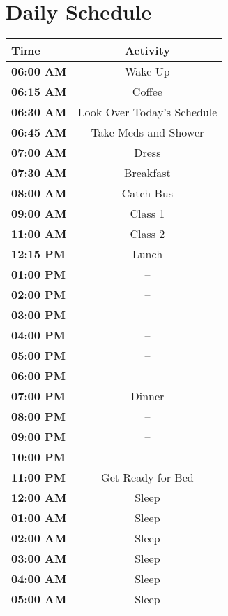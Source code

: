 \documentclass[10pt]{article}
\begin{document}
\section*{Daily Schedule}
\label{sec:dailyschedule}
\begin{center}
\begin{tabular}{ |l|c| }
	\hline
	\textbf{Time} & \textbf{Activity} \\ \hline
	\textbf{06:00 AM} & Wake Up \\ \hline
	\textbf{06:15 AM} & Coffee \\ \hline
	\textbf{06:30 AM} & Look Over Today's Schedule \\ \hline
	\textbf{06:45 AM} & Take Meds and Shower \\ \hline
	\textbf{07:00 AM} & Dress \\ \hline
	\textbf{07:30 AM} & Breakfast \\ \hline
	\textbf{08:00 AM} & Catch Bus \\ \hline
	\textbf{09:00 AM} & Class 1 \\ \hline
	\textbf{11:00 AM} & Class 2 \\ \hline
	\textbf{12:15 PM} & Lunch \\ \hline
	\textbf{01:00 PM} & -- \\ \hline
	\textbf{02:00 PM} & -- \\ \hline
	\textbf{03:00 PM} & -- \\ \hline
	\textbf{04:00 PM} & -- \\ \hline
	\textbf{05:00 PM} & -- \\ \hline
	\textbf{06:00 PM} & -- \\ \hline
	\textbf{07:00 PM} & Dinner \\ \hline
	\textbf{08:00 PM} & -- \\ \hline
	\textbf{09:00 PM} & -- \\ \hline
	\textbf{10:00 PM} & -- \\ \hline
	\textbf{11:00 PM} & Get Ready for Bed \\ \hline
	\textbf{12:00 AM} & Sleep \\ \hline
	\textbf{01:00 AM} & Sleep \\ \hline
	\textbf{02:00 AM} & Sleep \\ \hline
	\textbf{03:00 AM} & Sleep \\ \hline
	\textbf{04:00 AM} & Sleep \\ \hline
	\textbf{05:00 AM} & Sleep \\ \hline
\end{tabular}
\end{center}
\end{document}
